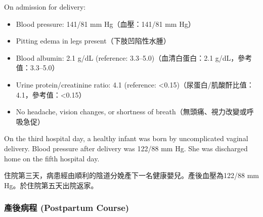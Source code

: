\documentclass[12pt,a4paper]{article}
\begin{document}
On admission for delivery:
\begin{itemize}[leftmargin=*]
    \item Blood pressure: 141/81 mm Hg（血壓：141/81 mm Hg）
    \item Pitting edema in legs present（下肢凹陷性水腫）
    \item Blood albumin: 2.1 g/dL (reference: 3.3--5.0)（血清白蛋白：2.1 g/dL，參考值：3.3--5.0）
    \item Urine protein/creatinine ratio: 4.1 (reference: <0.15)（尿蛋白/肌酸酐比值：4.1，參考值：<0.15）
    \item No headache, vision changes, or shortness of breath（無頭痛、視力改變或呼吸急促）
\end{itemize}

On the third hospital day, a healthy infant was born by uncomplicated vaginal delivery. Blood pressure after delivery was 122/88 mm Hg. She was discharged home on the fifth hospital day.

住院第三天，病患經由順利的陰道分娩產下一名健康嬰兒。產後血壓為122/88 mm Hg。於住院第五天出院返家。

\subsubsection{產後病程 (Postpartum Course)}
\end{document}
